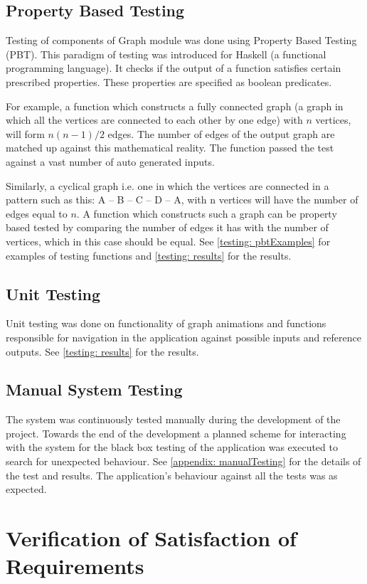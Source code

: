 \subsection{Property Based Testing}
Testing of components of Graph module was done using Property Based Testing (PBT).
This paradigm of testing was introduced for Haskell (a
functional programming language). It checks if the output of a function
satisfies certain prescribed properties. These properties are specified as
boolean predicates.

For example, a function which constructs a fully connected graph (a graph in
which all the vertices are connected to each other by one edge) with $n$
vertices, will form $n (n - 1) / 2$ edges. The number of edges of the output
graph are matched up against this mathematical reality. The function passed
the test against a vast number of auto generated inputs.

Similarly, a cyclical graph i.e. one in which the vertices are connected in a
pattern such as this: A -- B -- C -- D -- A, with n vertices will have the
number of edges equal to $n$. A function which constructs such a graph can be
property based tested by comparing the number of edges it has with the number
of vertices, which in this case should be equal. See \autoref{testing: pbtExamples}
for examples of testing functions and \autoref{testing: results} for the results.

\subsection{Unit Testing}
Unit testing was done on functionality of graph animations and
functions responsible for navigation in the application against possible inputs
and reference outputs. See \autoref{testing: results} for the results.

\subsection{Manual System Testing}
The system was continuously tested manually during the development of the
project. Towards the end of the development a planned scheme for
interacting with the system for the black box testing of the application was
executed to search for unexpected behaviour. See \autoref{appendix:
manualTesting} for the details of the test and results. The application's
behaviour against all the tests was as expected.

\section{Verification of Satisfaction of Requirements}


